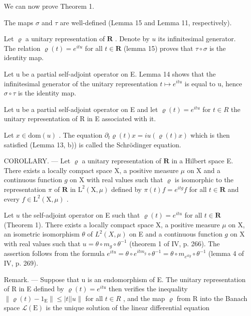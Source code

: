 We can now prove Theorem 1.

The maps \(\sigma\) and \(\tau\) are well-defined (Lemma 15 and Lemma 11, respectively).

Let \(\varrho\) a unitary representation of \(\mathbf{R}\) . Denote by \(u\) its infinitesimal generator. The relation \(\varrho(t) = e^{itu}\) for all \(t \in \mathbf{R}\) (lemma 15) proves that \(\tau \circ \sigma\) is the identity map.

Let u be a partial self-adjoint operator on E. Lemma 14 shows that the infinitesimal generator of the unitary representation \(t \mapsto e^{itu}\) is equal to u, hence \(\sigma \circ \tau\) is the identity map.

Let u be a partial self-adjoint operator on E and let \(\varrho(t) = e^{itu}\) for \(t \in R\) the unitary representation of R in E associated with it.

Let \(x \in \text{dom}(u)\) . The equation \(\partial_{t} \varrho(t)x = i u(\varrho(t)x)\) which is then satisfied (Lemma 13, b)) is called the Schrödinger equation.

COROLLARY. --- Let \(\varrho\) a unitary representation of \(\mathbf{R}\) in a Hilbert space E. There exists a locally compact space X, a positive measure \(\mu\) on X and a continuous function \(g\) on X with real values such that \(\varrho\) is isomorphic to the representation \(\pi\) of \(\mathbf{R}\) in \(\mathrm{L}^2 (\mathrm{X},\mu)\) defined by \(\pi (t)f = e^{itg}f\) for all \(t\in \mathbf{R}\) and every \(f\in \mathrm{L}^2 (\mathrm{X},\mu)\) .

Let \(u\) the self-adjoint operator on E such that \(\varrho(t) = e^{itu}\) for all \(t \in \mathbf{R}\) (Theorem 1). There exists a locally compact space X, a positive measure \(\mu\) on X, an isometric isomorphism \(\theta\) of \(L^2(X, \mu)\) on E and a continuous function \(g\) on X with real values such that \(u = \theta \circ m_g \circ \theta^{-1}\) (theorem 1 of IV, p. 266). The assertion follows from the formula \(e^{itu} = \theta \circ e^{itm_g} \circ \theta^{-1} = \theta \circ m_{e^{itg}} \circ \theta^{-1}\) (lemma 4 of IV, p. 269).

Remark. --- Suppose that u is an endomorphism of E. The unitary representation of R in E defined by \(\varrho(t) = e^{itu}\) then verifies the inequality \(\|\varrho(t) - 1_{\mathrm{E}}\| \leqslant |t||u\|\) for all \(t \in R\) , and the map \(\varrho\) from R into the Banach space \(\mathcal{L}(\mathrm{E})\) is the unique solution of the linear differential equation

